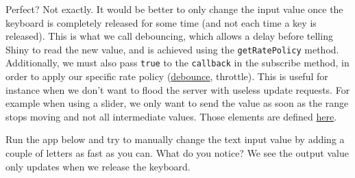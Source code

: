 \documentclass[]{book}
\begin{document}
Perfect? Not exactly. It would be better to only change the input value once the keyboard is completely released for some time (and not each time a key is released). This is what we call debouncing, which allows a delay before telling Shiny to read the new value, and is achieved using the \texttt{getRatePolicy} method. Additionally, we must also pass \texttt{true} to the \texttt{callback} in the subscribe method, in order to apply our specific rate policy (\href{https://davidwalsh.name/javascript-debounce-function}{debounce}, throttle). This is useful for instance when we don't want to flood the server with useless update requests. For example when using a slider, we only want to send the value as soon as the range stops moving and not all intermediate values. Those elements are defined \href{https://github.com/rstudio/shiny/blob/master/srcjs/input_rate.js}{here}.

Run the app below and try to manually change the text input value by adding a couple of letters as fast as you can. What do you notice? We see the output value only updates when we release the keyboard.
\end{document}
